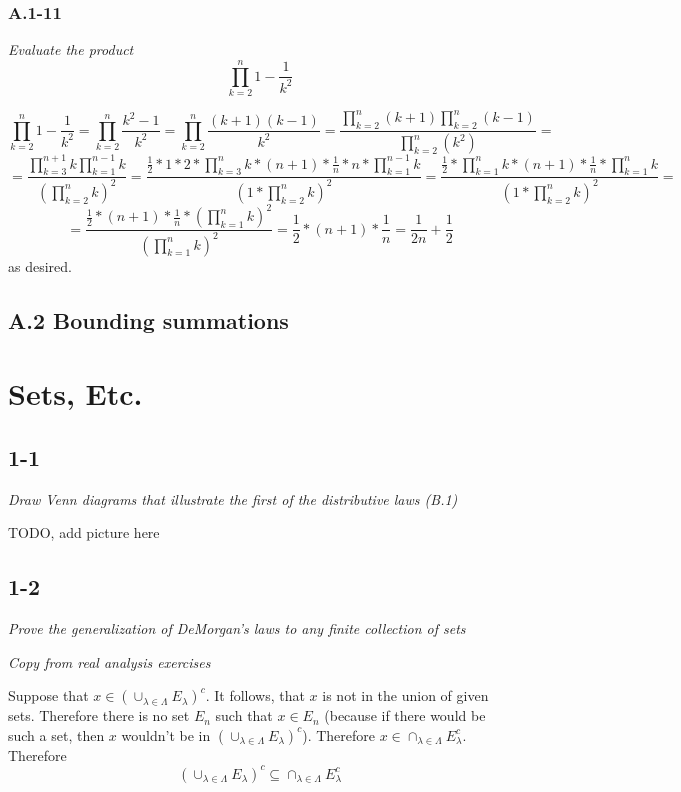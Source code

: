 \documentclass[11pt,oneside,titlepage]{book}
\begin{document}
\subsection*{A.1-11}

\textit{Evaluate the product
  $$\prod_{k = 2}^{n}{1 - \frac{1}{k^2}}$$
}

$$\prod_{k = 2}^{n}{1 - \frac{1}{k^2}} = \prod_{k = 2}^{n}{\frac{k^2 - 1}{k^2}} =
\prod_{k = 2}^{n}{\frac{(k + 1)(k - 1)}{k^2}} =
\frac{\prod_{k = 2}^{n}{(k + 1)}\prod_{k = 2}^{n}{(k - 1)}}{\prod_{k = 2}^{n}{(k^2)}} = $$
$$ =
\frac{\prod_{k = 3}^{n + 1}{k}\prod_{k = 1}^{n - 1}{k}}{(\prod_{k = 2}^{n}{k})^2} =
\frac{\frac{1}{2} * 1 * 2 * \prod_{k = 3}^{n}{k}   * (n + 1) * \frac{1}{n} * n *
  \prod_{k = 1}^{n - 1}{k}}
{(1 * \prod_{k = 2}^{n}{k})^2} =
\frac{\frac{1}{2} * \prod_{k = 1}^{n}{k}   * (n + 1) * \frac{1}{n} * 
  \prod_{k = 1}^{n}{k}}
{(1 * \prod_{k = 2}^{n}{k})^2} =$$
$$ = 
\frac{\frac{1}{2} * (n + 1) * \frac{1}{n} * (\prod_{k = 1}^{n}{k})^2}
{(\prod_{k = 1}^{n}{k})^2} = \frac{1}{2} * (n + 1) * \frac{1}{n} = \frac{1}{2n} + \frac{1}{2}$$
as desired.

\section*{A.2 Bounding summations}



\chapter{Sets, Etc.}

\section*{1-1}
\textit{Draw Venn diagrams that illustrate the first of the distributive laws
(B.1)}

TODO, add picture here

\section*{1-2}
\textit{Prove the generalization of DeMorgan's laws to any finite collection
  of sets}

\textit{Copy from real analysis exercises}

Suppose that $x \in \left(\cup_{\lambda \in \Lambda} E_\lambda \right)^c$. It
follows, that $x$ is not in the union of given sets. Therefore there is no
set $E_n$ such that $x \in E_n$ (because if there would be such a set, then $x$
wouldn't be in $\left(\cup_{\lambda \in \Lambda} E_\lambda \right)^c$).
Therefore $x \in \cap_{\lambda \in \Lambda} E_\lambda^c$. Therefore 
$$\left(\cup_{\lambda \in \Lambda} E_\lambda \right)^c \subseteq
\cap_{\lambda \in \Lambda} E_\lambda^c$$
\end{document}
